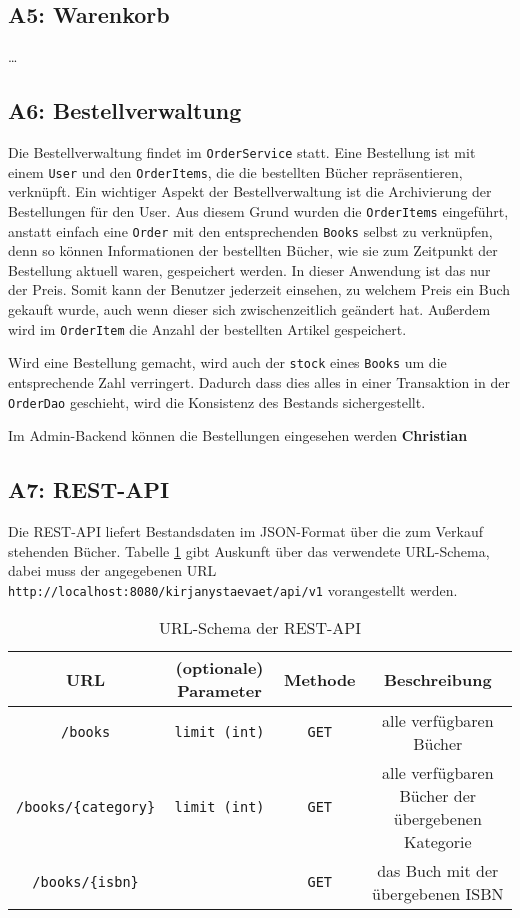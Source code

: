 	\subsection{A5: Warenkorb}\label{sec:umsetzung:cart}
	\dots
	
	\subsection{A6: Bestellverwaltung}\label{sec:umsetzung:Bestellverwaltung}
	Die Bestellverwaltung findet im \texttt{OrderService} statt. Eine Bestellung ist mit einem \texttt{User} und den \texttt{OrderItems}, die die bestellten Bücher repräsentieren, verknüpft. Ein wichtiger Aspekt der Bestellverwaltung ist die Archivierung der Bestellungen für den User. Aus diesem Grund wurden die \texttt{OrderItems} eingeführt, anstatt einfach eine \texttt{Order} mit den entsprechenden \texttt{Books} selbst zu verknüpfen, denn so können Informationen der bestellten Bücher, wie sie zum Zeitpunkt der Bestellung aktuell waren, gespeichert werden. In dieser Anwendung ist das nur der Preis. Somit kann der Benutzer jederzeit einsehen, zu welchem Preis ein Buch gekauft wurde, auch wenn dieser sich zwischenzeitlich geändert hat. Außerdem wird im \texttt{OrderItem} die Anzahl der bestellten Artikel gespeichert.
	
	Wird eine Bestellung gemacht, wird auch der \texttt{stock} eines \texttt{Books} um die entsprechende Zahl verringert. Dadurch dass dies alles in einer Transaktion in der \texttt{OrderDao} geschieht, wird die Konsistenz des Bestands sichergestellt.
	
	Im Admin-Backend können die Bestellungen eingesehen werden \textbf{Christian}
	
	\subsection{A7: REST-API}\label{sec:umsetzung:Rest}
	Die REST-API liefert Bestandsdaten im JSON-Format über die zum Verkauf stehenden Bücher. Tabelle \ref{rest-api} gibt Auskunft über das verwendete URL-Schema, dabei muss der angegebenen URL \lstinline|http://localhost:8080/kirjanystaevaet/api/v1| vorangestellt werden.
	
	\begin{table}[h]
		\caption{URL-Schema der REST-API}
		\begin{tabular}{|c|c|c|c|}
			\hline
			URL & (optionale) Parameter & Methode & Beschreibung \\ \hline \hline
			\lstinline|/books| & \lstinline|limit (int)| & \lstinline|GET| & alle verfügbaren Bücher \\ \hline
			\lstinline|/books/{category}| & \lstinline|limit (int)| & \lstinline|GET| & alle verfügbaren Bücher der übergebenen Kategorie \\ \hline
			\lstinline|/books/{isbn}| & & \lstinline|GET| & das Buch mit der übergebenen ISBN \\ \hline
		\end{tabular} 
		\label{rest-api}
	\end{table}
	

